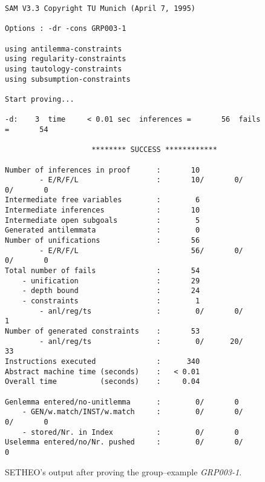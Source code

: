 \begin{figure}

\begin{verbatim}
SAM V3.3 Copyright TU Munich (April 7, 1995)

Options : -dr -cons GRP003-1 

using antilemma-constraints
using regularity-constraints
using tautology-constraints
using subsumption-constraints

Start proving...

-d:    3  time     < 0.01 sec  inferences =       56  fails =       54

                    ******** SUCCESS ************

Number of inferences in proof      :       10
        - E/R/F/L                  :       10/       0/       0/       0
Intermediate free variables        :        6
Intermediate inferences            :       10
Intermediate open subgoals         :        5
Generated antilemmata              :        0
Number of unifications             :       56
        - E/R/F/L                          56/       0/       0/       0
Total number of fails              :       54
    - unification                  :       29
    - depth bound                  :       24
    - constraints                  :        1
        - anl/reg/ts               :        0/       0/       1
Number of generated constraints    :       53
        - anl/reg/ts               :        0/      20/      33
Instructions executed              :      340
Abstract machine time (seconds)    :   < 0.01
Overall time          (seconds)    :     0.04

Genlemma entered/no-unitlemma      :        0/       0
    - GEN/w.match/INST/w.match     :        0/       0/       0/       0
    - stored/Nr. in Index          :        0/       0
Uselemma entered/no/Nr. pushed     :        0/       0/       0

\end{verbatim}
\caption{SETHEO's output after proving the group--example {\it
         GRP003-1\/}.}
\end{figure}\label{fig:GRP003-1}